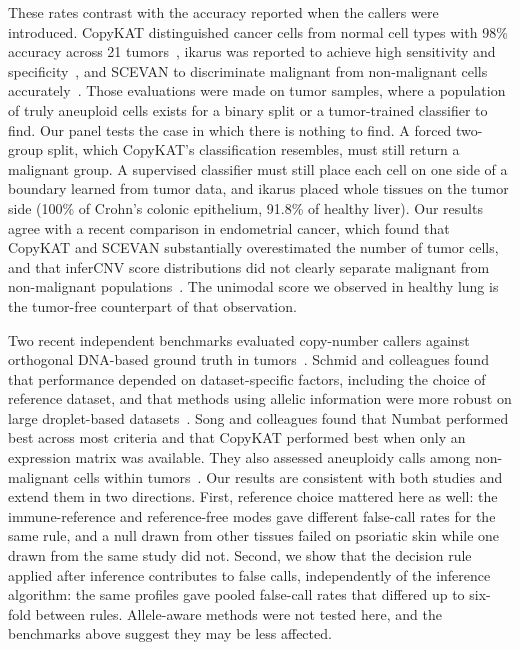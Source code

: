 \documentclass[11pt,letterpaper]{article}
\begin{document}
These rates contrast with the accuracy reported when the callers were introduced. CopyKAT distinguished cancer cells from normal cell types with 98\% accuracy across 21 tumors~\cite{copykat}, ikarus was reported to achieve high sensitivity and specificity~\cite{ikarus}, and SCEVAN to discriminate malignant from non-malignant cells accurately~\cite{scevan}. Those evaluations were made on tumor samples, where a population of truly aneuploid cells exists for a binary split or a tumor-trained classifier to find. Our panel tests the case in which there is nothing to find. A forced two-group split, which CopyKAT's classification resembles, must still return a malignant group. A supervised classifier must still place each cell on one side of a boundary learned from tumor data, and ikarus placed whole tissues on the tumor side (100\% of Crohn's colonic epithelium, 91.8\% of healthy liver). Our results agree with a recent comparison in endometrial cancer, which found that CopyKAT and SCEVAN substantially overestimated the number of tumor cells, and that inferCNV score distributions did not clearly separate malignant from non-malignant populations~\cite{dugo2025}. The unimodal score we observed in healthy lung is the tumor-free counterpart of that observation.

Two recent independent benchmarks evaluated copy-number callers against orthogonal DNA-based ground truth in tumors~\cite{schmid2025,song2025}. Schmid and colleagues found that performance depended on dataset-specific factors, including the choice of reference dataset, and that methods using allelic information were more robust on large droplet-based datasets~\cite{schmid2025}. Song and colleagues found that Numbat performed best across most criteria and that CopyKAT performed best when only an expression matrix was available. They also assessed aneuploidy calls among non-malignant cells within tumors~\cite{song2025}. Our results are consistent with both studies and extend them in two directions. First, reference choice mattered here as well: the immune-reference and reference-free modes gave different false-call rates for the same rule, and a null drawn from other tissues failed on psoriatic skin while one drawn from the same study did not. Second, we show that the decision rule applied after inference contributes to false calls, independently of the inference algorithm: the same profiles gave pooled false-call rates that differed up to six-fold between rules. Allele-aware methods were not tested here, and the benchmarks above suggest they may be less affected.
\end{document}
